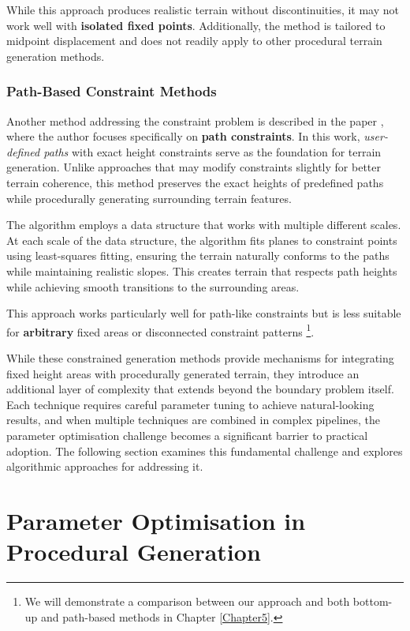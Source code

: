 While this approach produces realistic terrain without discontinuities, it may not work well with \textbf{isolated fixed points}. Additionally, the method is tailored to midpoint displacement and does not readily apply to other procedural terrain generation methods. 

\subsubsection{Path-Based Constraint Methods}
\label{path_based_method}

Another method addressing the constraint problem is described in the paper  , where the author focuses specifically on \textbf{path constraints}. In this work, \textit{user-defined paths} with exact height constraints serve as the foundation for terrain generation. Unlike approaches that may modify constraints slightly for better terrain coherence, this method preserves the exact heights of predefined paths while procedurally generating surrounding terrain features.

The algorithm employs a data structure that works with multiple different scales. At each scale of the data structure, the algorithm fits planes to constraint points using least-squares fitting, ensuring the terrain naturally conforms to the paths while maintaining realistic slopes. This creates terrain that respects path heights while achieving smooth transitions to the surrounding areas.

This approach works particularly well for path-like constraints but is less suitable for \textbf{arbitrary} fixed areas or disconnected constraint patterns \footnote{We will demonstrate a comparison between our approach and both bottom-up and path-based methods in Chapter \ref{Chapter5}.}.

While these constrained generation methods provide mechanisms for integrating fixed height areas with procedurally generated terrain, they introduce an additional layer of complexity that extends beyond the boundary problem itself. Each technique requires careful parameter tuning to achieve natural-looking results, and when multiple techniques are combined in complex pipelines, the parameter optimisation challenge becomes a significant barrier to practical adoption. The following section examines this fundamental challenge and explores algorithmic approaches for addressing it.

\section{Parameter Optimisation in Procedural Generation}
\label{parameter_optimization}


